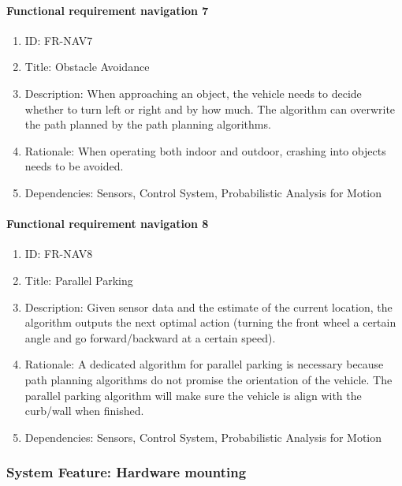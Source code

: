 \documentclass[compsoc,draftclsnofoot,onecolumn,10pt]{IEEEtran}
\begin{document}
	\paragraph{Functional requirement navigation 7}
		\begin{enumerate}
			\item ID: FR-NAV7
			\item Title: Obstacle Avoidance
			\item Description: When approaching an object, the vehicle needs to decide whether to turn left or right and by how much. The algorithm can overwrite the path planned by the path planning algorithms.
			\item Rationale: When operating both indoor and outdoor, crashing into objects needs to be avoided. 
			\item Dependencies: Sensors, Control System, Probabilistic Analysis for Motion
		\end{enumerate}

	\paragraph{Functional requirement navigation 8}
		\begin{enumerate}
			\item ID: FR-NAV8
			\item Title: Parallel Parking
			\item Description: Given sensor data and the estimate of the current location, the algorithm outputs the next optimal action (turning the front wheel a certain angle and go forward/backward at a certain speed).
			\item Rationale: A dedicated algorithm for parallel parking is necessary because path planning algorithms do not promise the orientation of the vehicle. The parallel parking algorithm will make sure the vehicle is align with the curb/wall when finished.
			\item Dependencies: Sensors, Control System, Probabilistic Analysis for Motion
		\end{enumerate}		
		
\subsubsection{System Feature: Hardware mounting}
\end{document}
